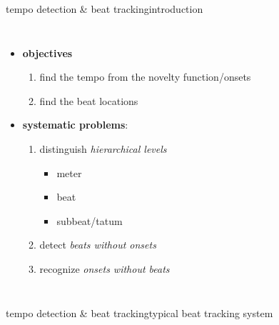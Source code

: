         \begin{frame}{tempo detection \& beat tracking}{introduction}
            \vspace{-3mm}
            \begin{columns}
            \begin{itemize}
                \item \textbf{objectives}
                    \begin{enumerate}
                        \item	find the tempo from the novelty function/onsets
                        \item	find the beat locations
                    \end{enumerate}
                \bigskip
                \item \textbf{systematic problems}:
                    \begin{enumerate}
                        \item	distinguish \textit{hierarchical levels}
                            \begin{itemize}
                                \item	meter
                                \item	beat
                                \item	subbeat/tatum
                            \end{itemize}
                        \item<1->	detect \textit{beats without onsets}
                        \item<1->	recognize \textit{onsets without beats}
                    \end{enumerate}
            \end{itemize}
            \end{columns}
        \end{frame}
        
        \begin{frame}{tempo detection \& beat tracking}{typical beat tracking system}
        \begin{figure}
        \scalebox{.75}{
			\centering
				}
		\end{figure}
        \end{frame}

